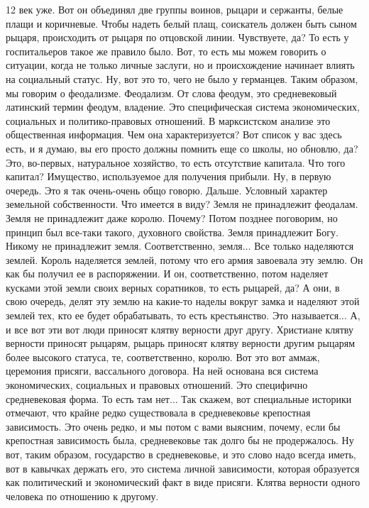 12 век уже. Вот он объединял две группы воинов, рыцари и сержанты, белые плащи и
коричневые. Чтобы надеть белый плащ, соискатель должен быть сыном рыцаря,
происходить от рыцаря по отцовской линии. Чувствуете, да? То есть у
госпитальеров такое же правило было. Вот, то есть мы можем говорить о ситуации,
когда не только личные заслуги, но и происхождение начинает влиять на социальный
статус. Ну, вот это то, чего не было у германцев. Таким образом, мы говорим о
феодализме. Феодализм. От слова феодум, это средневековый латинский термин
феодум, владение. Это специфическая система экономических, социальных и
политико-правовых отношений. В марксистском анализе это общественная информация.
Чем она характеризуется? Вот список у вас здесь есть, и я думаю, вы его просто
должны помнить еще со школы, но обновлю, да? Это, во-первых, натуральное
хозяйство, то есть отсутствие капитала. Что того капитал? Имущество,
используемое для получения прибыли. Ну, в первую очередь. Это я так очень-очень
общо говорю. Дальше. Условный характер земельной собственности. Что имеется в
виду? Земля не принадлежит феодалам. Земля не принадлежит даже королю. Почему?
Потом позднее поговорим, но принцип был все-таки такого, духовного свойства.
Земля принадлежит Богу. Никому не принадлежит земля. Соответственно, земля...
Все только наделяются землей. Король наделяется землей, потому что его армия
завоевала эту землю. Он как бы получил ее в распоряжении. И он, соответственно,
потом наделяет кусками этой земли своих верных соратников, то есть рыцарей, да?
А они, в свою очередь, делят эту землю на какие-то наделы вокруг замка и
наделяют этой землей тех, кто ее будет обрабатывать, то есть крестьянство. Это
называется... А, и все вот эти вот люди приносят клятву верности друг другу.
Христиане клятву верности приносят рыцарям, рыцарь приносят клятву верности
другим рыцарям более высокого статуса, те, соответственно, королю. Вот это вот
аммаж, церемония присяги, вассального договора. На ней основана вся система
экономических, социальных и правовых отношений. Это специфично средневековая
форма. То есть там нет... Так скажем, вот специальные историки отмечают, что
крайне редко существовала в средневековье крепостная зависимость. Это очень
редко, и мы потом с вами выясним, почему, если бы крепостная зависимость была,
средневековье так долго бы не продержалось. Ну вот, таким образом, государство в
средневековье, и это слово надо всегда иметь, вот в кавычках держать его, это
система личной зависимости, которая образуется как политический и экономический
факт в виде присяги. Клятва верности одного человека по отношению к другому.
